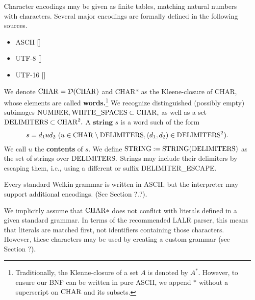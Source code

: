 Character encodings may be given as finite tables, matching natural numbers with characters. Several major encodings are formally defined in the following sources.
\begin{itemize}
	\item ASCII []
	\item UTF-8 []
	\item UTF-16 []
\end{itemize}

We denote $\mathrm{CHAR} = \mathcal{D}(\mathrm{CHAR})$ and CHAR* as the
Kleene-closure of CHAR, whose elements are called \textbf{words.}\footnote{Traditionally, the Klenne-closure of a set $A$ is denoted by $A^{*}.$ However, to ensure our BNF
can be written in pure ASCII, we append $*$ without a superscript on $\mathrm{CHAR}$ and its subsets.}
We recognize distinguished (possibly empty) subimages $\mathrm{NUMBER}, \mathrm{WHITE\_SPACES} \subset \mathrm{CHAR},$ as well as a set $\mathrm{DELIMITERS} \subset \mathrm{CHAR}^{2}.$ A $\textbf{string}$ $s$ is a word such of the form
\begin{align*}
s = d_{1}ud_{2} \ (u \in \mathrm{CHAR} \setminus \mathrm{DELIMITERS}, (d_{1}, d_{2}) \in \mathrm{DELIMITERS}^{2}).
\end{align*}
We call $u$ the \textbf{contents} of $s.$ We define $\mathrm{STRING} := \mathrm{STRING}(\mathrm{DELIMITERS})$ as the set of strings over $\mathrm{DELIMITERS}.$ Strings may include their delimiters by escaping them, i.e., using a different or suffix DELIMITER\_ESCAPE.

Every standard Welkin grammar is written in ASCII, but the interpreter may support additional encodings. (See Section ?.?).

We implicitly assume that $\mathrm{CHAR}*$ does not conflict with literals defined in a given standard grammar. In terms of the recommended LALR parser, this means that literals are matched first, not identifiers containing those characters. However, these characters may be used by creating a custom grammar (see Section ?).


